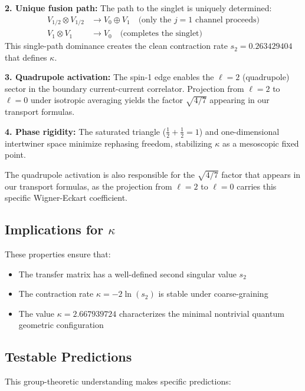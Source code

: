 \documentclass[11pt]{article}
\begin{document}
\textbf{2. Unique fusion path:} The path to the singlet is uniquely determined:
\begin{align}
  V_{1/2} \otimes V_{1/2} &\to V_0 \oplus V_1 \quad \text{(only the $j=1$ channel proceeds)} \\
  V_1 \otimes V_1 &\to V_0 \quad \text{(completes the singlet)}
\end{align}
This single-path dominance creates the clean contraction rate $s_2 = 0.263429404$ that defines $\kappa$.

\textbf{3. Quadrupole activation:} The spin-1 edge enables the $\ell=2$ (quadrupole) sector in the boundary current-current correlator. Projection from $\ell=2$ to $\ell=0$ under isotropic averaging yields the factor $\sqrt{4/7}$ appearing in our transport formulas.

\textbf{4. Phase rigidity:} The saturated triangle ($\frac{1}{2} + \frac{1}{2} = 1$) and one-dimensional intertwiner space minimize rephasing freedom, stabilizing $\kappa$ as a mesoscopic fixed point.

The quadrupole activation is also responsible for the $\sqrt{4/7}$ factor that appears in our transport formulas, as the projection from $\ell=2$ to $\ell=0$ carries this specific Wigner-Eckart coefficient.

\subsection{Implications for $\kappa$}

These properties ensure that:
\begin{itemize}
  \item The transfer matrix has a well-defined second singular value $s_2$
  \item The contraction rate $\kappa = -2 \ln(s_2)$ is stable under coarse-graining
  \item The value $\kappa = 2.667939724$ characterizes the minimal nontrivial quantum geometric configuration
\end{itemize}

\subsection{Testable Predictions}

This group-theoretic understanding makes specific predictions:
\end{document}
